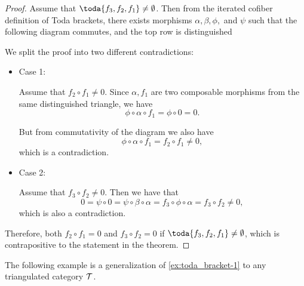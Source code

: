 \begin{proof}
	Assume that \( \toda{f_3, f_2, f_1} \neq \emptyset \). Then from the iterated cofiber definition of Toda brackets, there exists morphisms \( \alpha, \beta, \phi, \) and \( \psi \) such that the following diagram commutes, and the top row is distinguished
	\begin{center}
	\end{center}

	We split the proof into two different contradictions:

	\begin{itemize}
		\item{
			Case 1:

			Assume that \( f_2 \circ f_1 \neq 0 \). Since \( \alpha, f_1 \) are two composable morphisms from the same distinguished triangle, we have
			\[
				\phi \circ \alpha \circ f_1 = \phi \circ 0 = 0.
			\]

			But from commutativity of the diagram we also have
			\[
				\phi \circ \alpha \circ f_1 = f_2 \circ f_1 \neq 0,
			\]
			which is a contradiction.
		}
		\item{
			Case 2:

			Assume that \( f_3 \circ f_2 \neq 0 \). Then we have that
			\[
				0 = \psi \circ 0 = \psi \circ \beta \circ \alpha = f_3 \circ \phi \circ \alpha = f_3 \circ f_2 \neq 0,
			\]
			which is also a contradiction.
		}
	\end{itemize}

	Therefore, both \( f_2 \circ f_1 = 0 \) and \( f_3 \circ f_2 = 0 \) if \( \toda{f_3, f_2, f_1} \neq \emptyset \), which is contrapositive to the statement in the theorem.
\end{proof}

The following example is a generalization of \autoref{ex:toda_bracket-1} to any triangulated category \( {\mathcal{T}} \).

